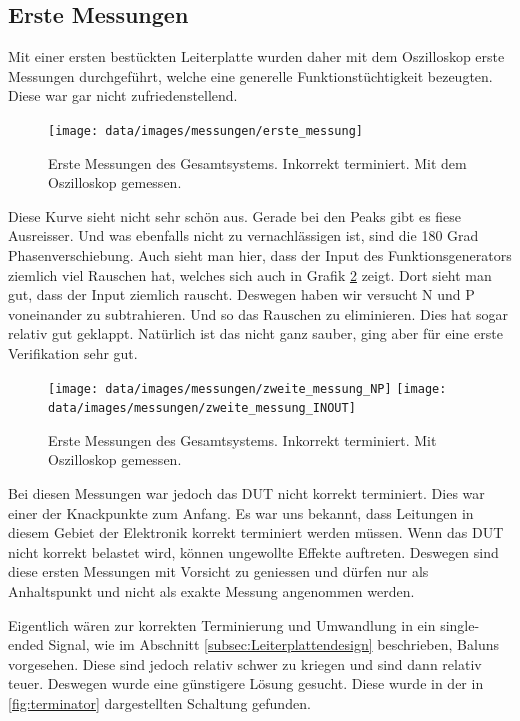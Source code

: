 \subsection{Erste Messungen}

Mit einer ersten bestückten Leiterplatte wurden daher mit dem Oszilloskop erste Messungen durchgeführt, welche eine generelle Funktionstüchtigkeit bezeugten. Diese war gar nicht zufriedenstellend.

\begin{figure}[H]
\begin{center}
    \texttt{[image: data/images/messungen/erste\_messung]}
    \caption{Erste Messungen des Gesamtsystems. Inkorrekt terminiert. Mit dem Oszilloskop gemessen.}
    \label{fig:messungen_erste}
\end{center}
\end{figure}

Diese Kurve sieht nicht sehr schön aus. Gerade bei den Peaks gibt es fiese Ausreisser. Und was ebenfalls nicht zu vernachlässigen ist, sind die 180 Grad Phasenverschiebung.
Auch sieht man hier, dass der Input des Funktionsgenerators ziemlich viel Rauschen hat, welches sich auch in Grafik \ref{fig:messungen_zweite} zeigt.
Dort sieht man gut, dass der Input ziemlich rauscht. Deswegen haben wir versucht N und P voneinander zu subtrahieren. Und so das Rauschen zu eliminieren. Dies hat sogar relativ gut geklappt. Natürlich ist das nicht ganz sauber, ging aber für eine erste Verifikation sehr gut.

\begin{figure}[H]
\begin{center}
    \texttt{[image: data/images/messungen/zweite\_messung\_NP]}
    \texttt{[image: data/images/messungen/zweite\_messung\_INOUT]}
    \caption{Erste Messungen des Gesamtsystems. Inkorrekt terminiert. Mit Oszilloskop gemessen.}
    \label{fig:messungen_zweite}
\end{center}
\end{figure}

Bei diesen Messungen war jedoch das DUT nicht korrekt terminiert. Dies war einer der Knackpunkte zum Anfang. Es war uns bekannt, dass Leitungen in diesem Gebiet der Elektronik korrekt terminiert werden müssen. Wenn das DUT nicht korrekt belastet wird, können ungewollte Effekte auftreten. Deswegen sind diese ersten Messungen mit Vorsicht zu geniessen und dürfen nur als Anhaltspunkt und nicht als exakte Messung angenommen werden.

Eigentlich wären zur korrekten Terminierung und Umwandlung in ein single-ended Signal, wie im Abschnitt \ref{subsec:Leiterplattendesign} beschrieben, Baluns vorgesehen. Diese sind jedoch relativ schwer zu kriegen und sind dann relativ teuer. Deswegen wurde eine günstigere Lösung gesucht. Diese wurde in der in \ref{fig:terminator} dargestellten Schaltung gefunden.

